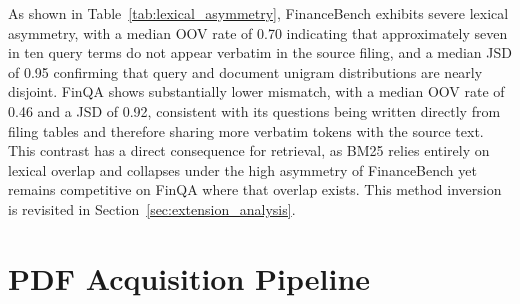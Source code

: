 \documentclass[12pt,twoside,maitrise]{dms}
\theoremstyle{definition}
\numberwithin{equation}{section}
\numberwithin{table}{chapter}
\numberwithin{figure}{chapter}
\begin{document}
\begin{table}[ht]
  \centering
  \caption{Query--corpus lexical asymmetry for FinanceBench ($n{=}150$) and FinQA
  ($n{=}503$). OOV rate and JSD indicate mismatch ($\uparrow$ = harder for lexical
  retrieval), Jaccard and term coverage indicate overlap ($\downarrow$ = harder).}
  \label{tab:lexical_asymmetry}
\end{table}

As shown in Table~\ref{tab:lexical_asymmetry}, FinanceBench exhibits severe lexical
asymmetry, with a median OOV rate of 0.70 indicating that approximately seven in ten
query terms do not appear verbatim in the source filing, and a median JSD of 0.95
confirming that query and document unigram distributions are nearly disjoint. FinQA
shows substantially lower mismatch, with a median OOV rate of 0.46 and a JSD of 0.92,
consistent with its questions being written directly from filing tables and therefore
sharing more verbatim tokens with the source text. This contrast has a direct
consequence for retrieval, as BM25 relies entirely on lexical overlap and collapses
under the high asymmetry of FinanceBench yet remains competitive on FinQA where that
overlap exists. This method inversion is revisited in
Section~\ref{sec:extension_analysis}.

\section{PDF Acquisition Pipeline}
\label{sec:pdf_pipeline}
\end{document}
